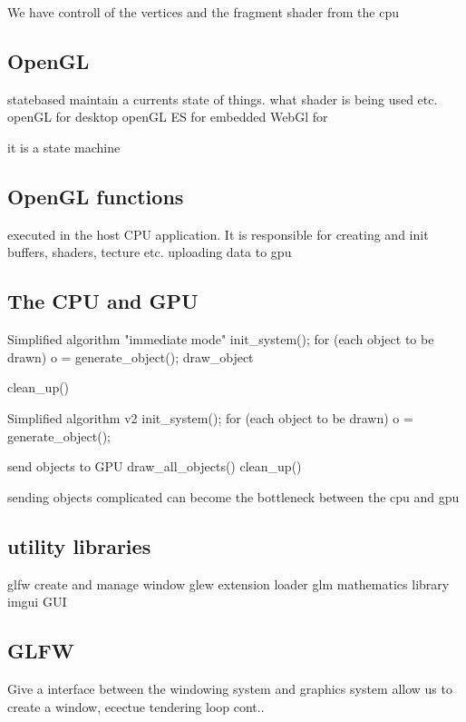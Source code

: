 We have controll of the vertices and the fragment shader from the cpu

\subsection*{OpenGL}

statebased maintain a currents state of things. what shader is being used etc. 
openGL for desktop
openGL ES for embedded
WebGl for 

it is a state machine

\subsection*{OpenGL functions}
executed in the host CPU application. It is responsible for creating and init buffers, shaders, tecture etc. 
uploading data to gpu 

\subsection*{The CPU and GPU}

\begin{wbox}{Simplified algorithm "immediate mode"}
init_system();
for (each object to be drawn)
	o = generate_object();
	draw_object

clean_up()
\end{wbox}

\begin{wbox}{Simplified algorithm v2}
init_system();
for (each object to be drawn)
	o = generate_object();

send objects to GPU
draw_all_objects()
clean_up()
\end{wbox}

sending objects complicated can become the bottleneck between the cpu and gpu


\subsection*{utility libraries}

glfw create and manage window
glew extension loader
glm mathematics library
imgui GUI

\subsection*{GLFW}
Give a interface between the windowing system and graphics system
allow us to create a window, ecectue tendering loop
cont..

